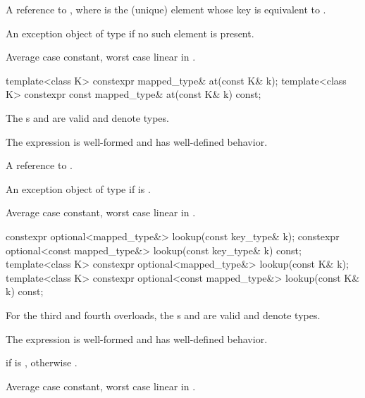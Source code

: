 \begin{itemdescr}
\pnum
\returns
A reference to , where  is the (unique) element whose key is equivalent to .

\pnum
\throws
An exception object of type  if no such element is present.

\pnum
\complexity
Average case constant, worst case linear in .
\end{itemdescr}

%
%
\begin{itemdecl}
template<class K> constexpr mapped_type&       at(const K& k);
template<class K> constexpr const mapped_type& at(const K& k) const;
\end{itemdecl}

\begin{itemdescr}
\pnum
\constraints
The s  and
 are valid and denote types.

\pnum
\expects
The expression  is well-formed and has well-defined behavior.

\pnum
\returns
A reference to .

\pnum
\throws
An exception object of type 
if  is .

\pnum
\complexity
Average case constant, worst case linear in .
\end{itemdescr}

%
\begin{itemdecl}
constexpr optional<mapped_type&>       lookup(const key_type& k);
constexpr optional<const mapped_type&> lookup(const key_type& k) const;
template<class K> constexpr optional<mapped_type&>       lookup(const K& k);
template<class K> constexpr optional<const mapped_type&> lookup(const K& k) const;
\end{itemdecl}

\begin{itemdescr}
\pnum
\constraints
For the third and fourth overloads,
the s
 and \linebreak
{}
are valid and denote types.

\pnum
\expects
The expression  is well-formed and has well-defined behavior.

\pnum
\returns
{} if  is ,
otherwise .

\pnum
\complexity
Average case constant, worst case linear in .
\end{itemdescr}

